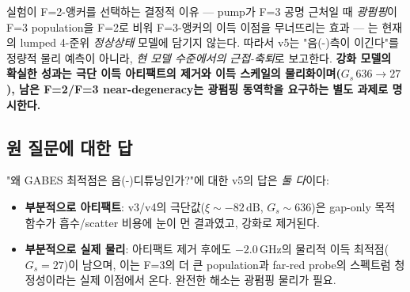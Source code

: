 \documentclass[11pt,a4paper]{article}
\newcommand{\dB}{\,\mathrm{dB}}
\newcommand{\GHz}{\,\mathrm{GHz}}
\begin{document}
실험이 F=2-앵커를 선택하는 결정적 이유 --- pump가 F=3 공명 근처일 때
\emph{광펌핑}이 F=3 population을 F=2로 비워 F=3-앵커의 이득 이점을 무너뜨리는
효과 --- 는 현재의 lumped 4-준위 \emph{정상상태} 모델에 담기지 않는다. 따라서
v5는 "음(-)측이 이긴다"를 정량적 물리 예측이 아니라, \emph{현 모델 수준에서의
근접-축퇴}로 보고한다. \textbf{강화 모델의 확실한 성과는 극단 이득 아티팩트의
제거와 이득 스케일의 물리화이며($G_s\,636\to27$), 남은 F=2/F=3 near-degeneracy는
광펌핑 동역학을 요구하는 별도 과제로 명시한다.}

\subsection{원 질문에 대한 답}
"왜 GABES 최적점은 음(-)디튜닝인가?"에 대한 v5의 답은 \emph{둘 다}이다:
\begin{itemize}[nosep]
\item \textbf{부분적으로 아티팩트}: v3/v4의 극단값($\xi\sim-82\dB$, $G_s\sim636$)은
      gap-only 목적함수가 흡수/scatter 비용에 눈이 먼 결과였고, 강화로 제거된다.
\item \textbf{부분적으로 실제 물리}: 아티팩트 제거 후에도 $-2.0\GHz$의 물리적
      이득 최적점($G_s=27$)이 남으며, 이는 F=3의 더 큰 population과 far-red probe의
      스펙트럼 청정성이라는 실제 이점에서 온다. 완전한 해소는 광펌핑 물리가 필요.
\end{itemize}

\end{document}

